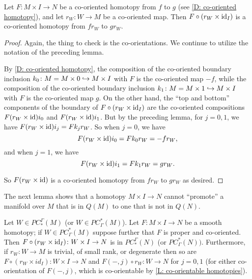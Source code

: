 \begin{corollary}\label{C: universal homotopy boundary co-orientation}
Let $F \colon M \times I \to N$ be a co-oriented homotopy from $f$ to $g$ (see \cref{D: co-oriented homotopy}), and let $r_W \colon W \to M$ be a co-oriented map.
Then $F \circ (r_W \times \mathrm{id}_I)$ is a co-oriented homotopy from $fr_W$ to $gr_W$.
\end{corollary}
\begin{proof}
Again, the thing to check is the co-orientations. We continue to utilize the notation of the preceding lemma.

By \cref{D: co-oriented homotopy}, the composition of the co-oriented boundary inclusion $k_0 \colon M = M \times 0 \hookrightarrow M \times I$ with $F$ is the co-oriented map $-f$, while the composition of the co-oriented boundary inclusion $k_1 \colon M = M \times 1 \hookrightarrow M \times I$ with $F$ is the co-oriented map
$g$. On the other hand, the ``top and bottom'' components of the boundary of $F \circ (r_W \times \mathrm{id}_I)$ are the co-oriented compositions $F (r_W\times \mathrm{id}) i_0$ and $F (r_W\times \mathrm{id}) i_1$. 
But by the preceding lemma, for $j=0,1$, we have $F (r_W\times \mathrm{id}) i_j = F k_j r_W$.
So when $j=0$, we have 
$$ F (r_W\times \mathrm{id}) i_0 = F k_0 r_W = -f r_W,$$ 
and when $j=1$, we have 
$$ F (r_W\times \mathrm{id}) i_1 = F k_1 r_W = g r_W.$$

So $F (r_W\times \mathrm{id})$ is a co-oriented homotopy from $fr_W$ to $gr_W$ as desired.
\end{proof}


The next lemma shows that a homotopy $M \times I \to N$ cannot ``promote'' a manifold over $M$ that is in $Q(M)$ to one that is not in $Q(N)$.

\begin{lemma}\label{L: dessicated homotopy}
	Let $W \in PC_*^\Gamma(M)$ (or $W \in PC^*_\Gamma(M)$).
	Let $F \colon M \times I \to N$ be a smooth homotopy; if $W \in PC^*_\Gamma(M)$ suppose further that $F$ is proper and co-oriented.
	Then $F \circ (r_W \times \mathrm{id}_I) \colon W \times I \to N$ is in $PC_*^\Gamma(N)$ (or $PC^*_\Gamma(N))$.
	Furthermore,
	if $r_W \colon W \to M$ is trivial, of small rank, or degenerate then so are
	$F \circ (r_W \times id_I) \colon W \times I \to N$ and $F(-,j) \circ r_W \colon W \to N$ for $j=0,1$ (for either co-orientation of $F(-,j)$, which is co-orientable by \cref{L: co-orientable homotopies}).
\end{lemma}

